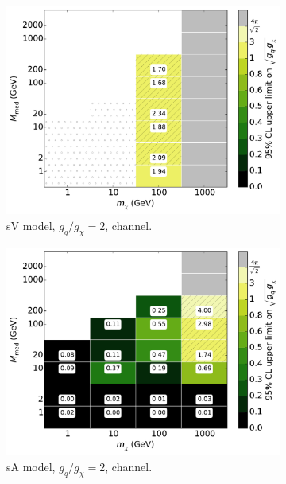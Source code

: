 \begin{figure}
\begin{subfigure}[t]{0.32\textwidth}
    \centering
    \includegraphics[width=1.\textwidth]{figures/grid_basepoints_SVD_rat2_monoWZ.pdf}
    \caption{sV model, $g_q/g_{\chi} = 2$, \monoWZ channel.}
    \vspace{0.75cm}
  \end{subfigure}
  \begin{subfigure}[t]{0.32\textwidth}
    \centering
    \includegraphics[width=1.\textwidth]{figures/grid_basepoints_SAD_rat2_monojet.pdf}
    \caption{sA model, $g_q/g_{\chi} = 2$, \monojet channel.}
  \end{subfigure}
  \begin{subfigure}[t]{0.32\textwidth}
    \centering

\end{subfigure}
\end{figure}
